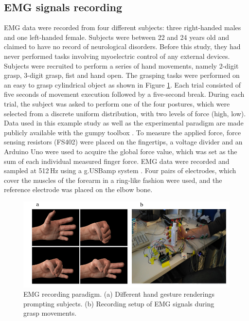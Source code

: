 \documentclass[journal,article,submit,moreauthors,pdftex,10pt,a4paper]{Definitions/mdpi}
\begin{document}
\subsection{EMG signals recording}
EMG data were recorded from four different subjects: three right-handed males and one left-handed female. Subjects were between 22 and 24 years old and claimed to have no record of neurological disorders. Before this study, they had never performed tasks involving myoelectric control of any external devices. Subjects were recruited to perform a series of hand movements, namely 2-digit grasp, 3-digit grasp, fist and hand open. The grasping tasks were performed on an easy to grasp cylindrical object as shown in Figure \ref{FIG:EXPERIMENTAL_PARADIGM}. Each trial consisted of five seconds of movement execution followed by a five-second break. During each trial, the subject was asked to perform one of the four postures, which were selected from a discrete uniform distribution, with two levels of force (high, low). Data used in this example study as well as the experimental paradigm are made publicly available with the gumpy toolbox \cite{31}. To measure the applied force, force sensing resistors (FS402) were placed on the fingertips, a voltage divider and an Arduino Uno \cite{32} were used to acquire the global force value, which was set as the sum of each individual measured finger force. EMG data were recorded and sampled at 512\,Hz using a g.USBamp system \cite{33}. Four pairs of electrodes, which cover the muscles of the forearm in a ring-like fashion were used, and the reference electrode was placed on the elbow bone. 
\begin{figure}[H]
    \centering
    \includegraphics [width=0.8\linewidth]{EXPERIMENTAL_PARADIGM.png}
    \caption{ EMG recording paradigm. (a) Different hand gesture renderings prompting subjects.  (b) Recording setup of EMG signals during grasp movements.
}
    \label{FIG:EXPERIMENTAL_PARADIGM}
\end{figure}
\end{document}
